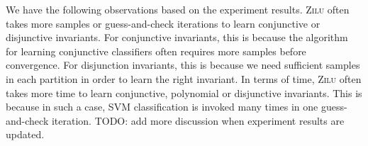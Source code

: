 We have the following observations based on the experiment results. \textsc{Zilu} often takes more samples or guess-and-check iterations to learn conjunctive or disjunctive invariants. For conjunctive invariants, this is because the algorithm~\cite{sharma2012interpolants} for learning conjunctive classifiers often requires more samples before convergence. For disjunction invariants, this is because we need sufficient samples in each partition in order to learn the right invariant. In terms of time, \textsc{Zilu} often takes more time to learn conjunctive, polynomial or disjunctive invariants. This is because in such a case, SVM classification is invoked many times in one guess-and-check iteration. TODO: add more discussion when experiment results are updated. 




